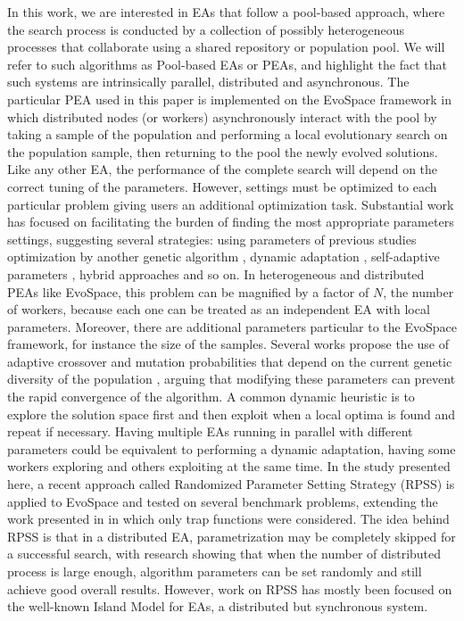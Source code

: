 \documentclass[conference]{IEEEtran}
\begin{document}
In this work, we are interested in EAs that follow a
pool-based approach, where the search process is conducted by a
collection of possibly heterogeneous processes that collaborate using
a shared repository or population pool. We will refer to such
algorithms as Pool-based EAs or PEAs, and highlight the fact that such
systems are intrinsically parallel, distributed and asynchronous.
The particular PEA used in this paper is implemented on
the EvoSpace framework  \cite{GValdez2015}
in which distributed nodes (or workers) asynchronously interact
with the pool by taking a sample of the population and performing
a local evolutionary search on the population sample, then returning
to the pool the newly evolved solutions.
Like any other EA, the performance of the complete search will depend
on the correct tuning of the parameters. However, settings
must be optimized to each particular problem \cite{de2007parameter}
giving users an additional optimization task.
Substantial work has focused on facilitating the burden of finding
the most appropriate parameters settings, suggesting several strategies:
using parameters of previous studies \cite{eiben1999parameter}
optimization by another genetic algorithm \cite{grefenstette1986optimization},
dynamic adaptation \cite{eiben1999parameter},
self-adaptive parameters \cite{pellerin2004self}, hybrid approaches \cite{de2007parameter} and so on.
In heterogeneous and distributed PEAs like EvoSpace, this problem can
be magnified by a factor of $N$, the number of workers, because each one
can be treated as an independent EA with local parameters. Moreover, there
are additional parameters particular to the EvoSpace framework,
for instance the size of the samples.
Several works propose the use of adaptive crossover and mutation probabilities
that depend on the current genetic diversity of the population \cite{pellerin2004self},
arguing that modifying these parameters can prevent the rapid convergence of the
algorithm.
A common dynamic heuristic is to explore the solution space first and then exploit
when a local optima is found and repeat if necessary.
Having multiple EAs running in parallel with different parameters could be
equivalent to performing a dynamic adaptation, having some workers exploring
and others exploiting at the same time.
In the study presented here, a recent approach called Randomized Parameter
Setting Strategy (RPSS) \cite{fuku1,fuku2} is applied to EvoSpace and tested on
several benchmark problems, extending the work presented in \cite{garcia2014randomized}
in which only trap functions were considered.
The idea behind RPSS is that in a distributed EA, parametrization may be
completely skipped for a successful search, with research showing that when the
number of distributed process is large enough, algorithm parameters can be set
randomly and still achieve good overall results. However, work on RPSS has
mostly been focused on the well-known Island Model for EAs, a distributed but synchronous system.
\end{document}
